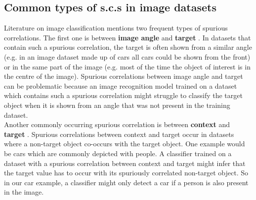 \documentclass{article}
\begin{document}
\subsection{Common types of s.c.s in image datasets}
Literature on image classification mentions two frequent types of spurious correlations. 
The first one is between \textbf{image angle} and \textbf{target} \cite{5995347}.
In datasets that contain such a spurious correlation, the target is often shown from a similar angle (e.g. in an image dataset made up of cars all cars
could be shown from the front) or in the same part of the image (e.g. most of the time the object of interest is in the centre of the image).
Spurious correlations between image angle and target can be problematic because an image recognition model trained on a dataset
which contains such a spurious correlation might struggle to classify the target object when it is shown from an angle that was not present in the training dataset. \\
Another commonly occurring spurious correlation is between \textbf{context} and \textbf{target} \cite{Singh_2020_CVPR}.
Spurious correlations between context and target occur in datasets where a non-target object co-occurs with the target object.
One example would be cars which are commonly depicted with people. A classifier trained on a dataset with a spurious
correlation between context and target might infer that the target value has to occur with its spuriously correlated non-target
object. So in our car example, a classifier might only detect a car if a person is also present in the image.
\end{document}
